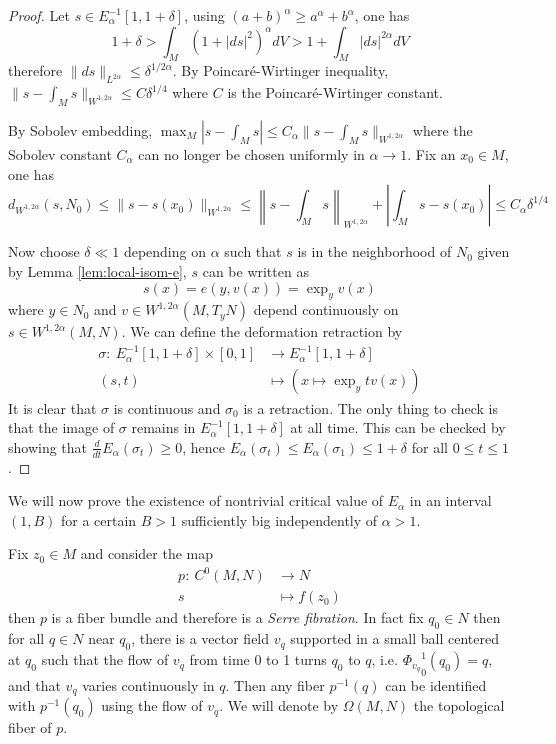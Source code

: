 \begin{proof}
Let \(s\in E_\alpha^{-1}[1, 1+\delta]\), using \((a+b)^\alpha \geq a^\alpha + b^\alpha\), one has
\[
 1 + \delta > \int_M (1+|ds|^2)^\alpha dV > 1 + \int_M |ds|^{2\alpha}dV
\]
therefore \(\|ds\|_{L^{2\alpha}}\leq \delta ^{1/{2\alpha}}\). By Poincaré-Wirtinger
inequality, \(\|s-\int_M s\|_{W^{1,2\alpha}}\leq C \delta^{1/4}\) where \(C\) is the
Poincaré-Wirtinger constant.

By Sobolev embedding, \(\max_M |s-\int_M s| \leq C_\alpha \|s -\int_M s\|_{W^{1,2\alpha}}\)
where the Sobolev constant \(C_\alpha\) can no longer be chosen uniformly in \(\alpha
\to 1\). Fix an \(x_0\in M\), one has
\[
 d_{W^{1,2\alpha}}(s, N_0) \leq \|s - s(x_0)\|_{W^{1,2\alpha}} \leq \left\|s-\int_M
s\right\|_{W^{1,2\alpha}} + \left|\int_M s - s(x_0)\right| \leq C_\alpha \delta^{1/4}
\]

Now choose \(\delta \ll 1\) depending on \(\alpha\) such that \(s\) is in the
neighborhood of \(N_0\) given by Lemma \ref{lem:local-isom-e}, \(s\) can be written as
\[
 s(x) = e(y,v(x)) = \exp_y v(x)
\]
where \(y\in N_0\) and \(v\in W^{1,2\alpha}(M, T_yN)\) depend continuously on \(s\in
W^{1,2\alpha}(M,N)\). We can define the deformation retraction by
\begin{align*}
  \sigma:\ E^{-1}_\alpha [1,1+\delta]\times [0,1] & \longrightarrow E^{-1}_\alpha[1,1+\delta]\\
  	   		 (s,t)		    	  &\longmapsto \left( x\mapsto \exp_y tv(x)\right)
\end{align*}
It is clear that \(\sigma\) is continuous and \(\sigma_0\) is a retraction. The only
thing to check is that the image of \(\sigma\) remains in \(E_\alpha^{-1}[1,1+\delta]\) at all time. This can be checked by showing that \(\frac{d}{dt}E_\alpha(\sigma_t) \geq
0\), hence \(E_\alpha(\sigma_t) \leq E_\alpha(\sigma_1) \leq 1+\delta\) for all \(0\leq
t\leq 1\).
\end{proof}

We will now prove the existence of nontrivial critical value of \(E_\alpha\) in an
interval \((1, B)\) for a certain \(B>1\) sufficiently big independently of \(\alpha
> 1\).

Fix \(z_0\in M\) and consider the map 
\begin{align*}
  p: \ C^0(M,N) &\longrightarrow N\\
       s	&\longmapsto	 f(z_0)
\end{align*}
then \(p\) is a fiber bundle and therefore is a \emph{Serre fibration}. In fact fix \(q_0\in N\) then for all \(q\in N\) near \(q_0\), there is a vector field \(v_q\) supported
in a small ball centered at \(q_0\) such that the flow of \(v_q\) from time 0 to 1
turns \(q_0\) to \(q\), i.e. \({\Phi_{v_q}}_0^1(q_0)=q\), and that \(v_q\) varies continuously
in \(q\). Then any fiber \(p^{-1}(q)\) can be identified with \(p^{-1}(q_0)\) using
the flow of \(v_q\). We will denote by \(\Omega(M,N)\) the topological fiber of \(p\).


